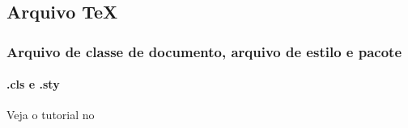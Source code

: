 \subsection{Arquivo \TeX{}}\label{sec:tex}



\begin{frame}[label={clsfile}]
\frametitle{Arquivo de classe de documento, arquivo de estilo e pacote}
\framesubtitle{.cls e .sty}
Veja o tutorial no  
\end{frame}

